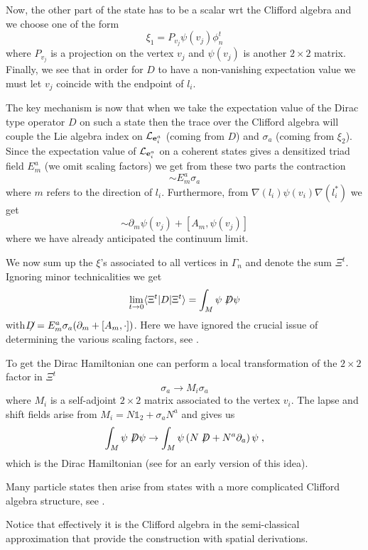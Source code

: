 \documentclass[12pt]{article}
\def\G{\Gamma}
\def\X{\Xi}
\def\ca{{\cal A}}
\def\cl{{\cal L}}
\newcommand{\pa}{\partial}
\begin{document}
Now, the other part of the state has to be a scalar wrt the Clifford algebra and we choose one of the form
$$
\xi_1=P_{v_j}\psi(v_j) \phi^t_n
$$
where $P_{v_j}$ is a projection on the vertex $v_j$ and $\psi(v_j)$ is another $2\times 2$ matrix. Finally, we see that in order for $D$ to have a non-vanishing expectation value we must let $v_j$ coincide with the endpoint of $l_i$. 

The key mechanism is now that when we take the expectation value of the Dirac type operator $D$ on such a state then the trace over the Clifford algebra will couple the Lie algebra index on $ \cl_{{\bf e}_i^a} $ (coming from $D$) and $\sigma_a$ (coming from $\xi_2$). Since the expectation value of  $\cl_{{\bf e}_i^a}$ on a coherent states gives a densitized triad field $E_m^a$ (we omit scaling factors) we get from these two parts the contraction
$$
\sim E_m^a \sigma_a
$$
where $m$ refers to the direction of $l_i$. Furthermore, from $\nabla(l_i) \psi(v_i)\nabla(l_i^*)$ we get
$$
\sim \pa_m \psi(v_j) + [A_m,\psi(v_j)]
$$
where we have already anticipated the continuum limit. 

We now sum up the $\xi$'s associated to all vertices in $\G_n$ and denote the sum $\X^t$.   Ignoring minor technicalities we get
$$
\lim_{t\rightarrow 0}\langle \X^t\vert D\vert \X^t\rangle =\int_M \psi \not\hspace{-1mm} D \psi
$$
with $\not\hspace{-2mm} D= E_m^a \sigma_a( \pa_m + [A_m,\cdot])$. Here we have ignored the crucial issue of determining the various scaling factors, see \cite{Aastrup:2011dt}.


To get the Dirac Hamiltonian one can perform a local transformation of the $2\times 2$ factor in $\X^t$
$$
\sigma_a\rightarrow M_i \sigma_a
$$
where $M_i$ is a self-adjoint $2\times 2$ matrix associated to the vertex $v_i$. The lapse and shift fields arise from $M_i = N \mathds{1}_2 + \sigma_a N^a$ and gives us
$$
\int_M \psi \not\hspace{-1mm} D \psi \rightarrow \int_M \psi \left( N \not\hspace{-1mm} D + N^a \pa_a\right) \psi\;,
$$
which is the Dirac Hamiltonian (see \cite{Aastrup:2009dy} for an early version of this idea).

Many particle states then arise from states with a more complicated Clifford algebra structure, see \cite{Aastrup:2011dt}.

Notice that effectively it is the Clifford algebra in the semi-classical approximation that provide the construction with spatial derivations. 
\end{document}

